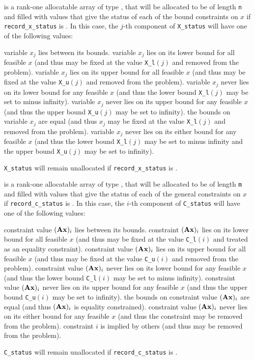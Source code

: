 \documentclass{galahad}
\begin{document}
\begin{description}
 is a rank-one allocatable array of type \integer,
that will be allocated to be of length {\tt n} and filled with values
that give the status of each of the bound constraints on $x$ if 
{\tt record\_x\_status} is \true. In this case, the $j$-th component of 
{\tt X\_status} will have one of the following values:
\begin{description}
 variable $x_j$ lies between its bounds.
 variable $x_j$ lies on its lower bound for all feasible $x$ (and thus 
may be fixed at the value {\tt X\_l}$(j)$ and removed from the problem).
 variable $x_j$ lies on its upper bound for all feasible $x$ 
(and thus 
may be fixed at the value {\tt X\_u}$(j)$ and removed from the problem).
 variable $x_j$ never lies on its lower bound for any feasible $x$ 
(and thus the lower bound {\tt X\_l}$(j)$ may be set to minus infinity).
 variable $x_j$ never lies on its upper bound for any feasible $x$ 
(and thus the upper bound {\tt X\_u}$(j)$ may be set to infinity).
 the bounds on variable $x_j$ are equal
(and thus $x_j$
may be fixed at the value {\tt X\_l}$(j)$ and removed from the problem).
 variable $x_j$ never lies on its either bound for any feasible $x$ 
(and thus the lower bound {\tt X\_l}$(j)$ may be set to minus infinity
and the upper bound {\tt X\_u}$(j)$ may be set to infinity).
\end{description}
{\tt X\_status} will remain unallocated if
{\tt record\_x\_status} is \false.

 is a rank-one allocatable array of  
type \integer, that will be allocated to be of length {\tt m}
and filled with values that give the status of each of the general constraints
on $x$ if {\tt record\_c\_status} is \true. In this case, the $i$-th
component of {\tt C\_status} will have one of the following values:
\begin{description}
 constraint value $({\mathbf{A}} {\mathbf{x}})_i$ lies between its bounds.
 constraint $({\mathbf{A}} {\mathbf{x}})_i$ lies on its lower bound for all feasible 
$x$ (and thus 
may be fixed at the value {\tt C\_l}$(i)$ and treated as an equality constraint).
 constraint value $({\mathbf{A}} {\mathbf{x}})_i$ lies on its upper bound for all 
feasible $x$ (and thus may be fixed at the value 
{\tt C\_u}$(i)$ and removed from the problem).
 constraint value $({\mathbf{A}} {\mathbf{x}})_i$ never lies on its lower bound for 
any feasible $x$ 
(and thus the lower bound {\tt C\_l}$(i)$ may be set to minus infinity).
 constraint value $({\mathbf{A}} {\mathbf{x}})_i$  never lies on its upper 
bound for any feasible $x$ 
(and thus the upper bound {\tt C\_u}$(i)$ may be set to infinity).
 the bounds on constraint value $({\mathbf{A}} {\mathbf{x}})_i$ are equal
(and thus $({\mathbf{A}} {\mathbf{x}})_i$ is equality constrained).
 constraint value $({\mathbf{A}} {\mathbf{x}})_i$ never lies on its either bound for any 
feasible $x$ (and thus the constraint may be removed from the problem).
 constraint $i$ is implied by others 
(and thus may be removed from the problem).
\end{description}
{\tt C\_status} will remain unallocated if
{\tt record\_c\_status} is \false.


\end{description}
\end{document}
